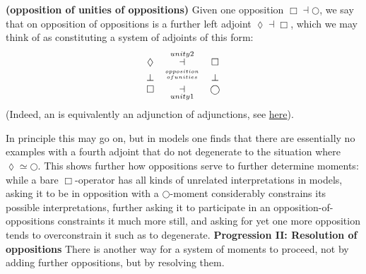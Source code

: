 \begin{defn}
\label{HigherOrderOpposition}\hypertarget{HigherOrderOpposition}{}
\textbf{(opposition of unities of oppositions)}
Given one opposition $\Box \dashv \bigcirc$, we say that on opposition of oppositions is a further left adjoint $\lozenge \dashv \Box$, which we may think of as constituting a system of adjoints of this form:
\begin{displaymath}
\begin{matrix}
\lozenge &\overset{unity2}{\dashv}& \Box
\\
\bot &\stackrel{opposition \atop {ofunities}}{}& \bot
\\
\Box &\underset{unity1}{\dashv}& \bigcirc
\end{matrix}
\end{displaymath}
(Indeed, an  is equivalently an adjunction of adjunctions, see \href{http://ncatlab.org/nlab/show/adjoint+triple#AsAdjunctionOfAdjunctions}{here}).
\end{defn}
In principle this may go on, but in models one finds that there are essentially no examples with a fourth adjoint that do not degenerate to the  situation where $\lozenge \simeq \bigcirc$.
This shows further how oppositions serve to further determine moments: while a bare $\Box$-operator has all kinds of unrelated interpretations in models, asking it to be in opposition with a $\bigcirc$-moment considerably constrains its possible interpretations, further asking it to participate in an opposition-of-oppositions constraints it much more still, and asking for yet one more opposition tends to overconstrain it such as to degenerate.
\textbf{Progression II: Resolution of oppositions}
There is another way for a system of moments to proceed, not by adding further oppositions, but by resolving them.
